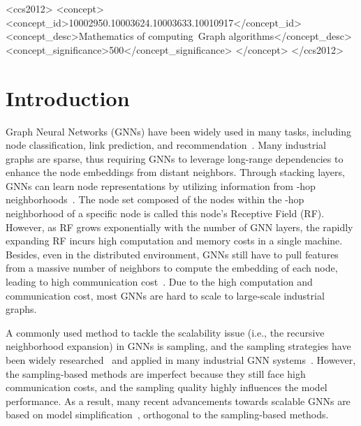 \documentclass[sigconf]{acmart}
\begin{document}
\begin{CCSXML}
<ccs2012>
<concept>
<concept_id>10002950.10003624.10003633.10010917</concept_id>
<concept_desc>Mathematics of computing~Graph algorithms</concept_desc>
<concept_significance>500</concept_significance>
</concept>
</ccs2012>
\end{CCSXML}




\maketitle





\section{Introduction}
Graph Neural Networks (GNNs) have been widely used in many tasks, including node classification, link prediction, and recommendation~\citep{zhang2020reliable, zhang2021rod, cui2020adaptive, miao2021degnn,jiang2022zoomer}.
Many industrial graphs are sparse, thus requiring GNNs to leverage long-range dependencies to enhance the node embeddings from distant neighbors.
Through stacking  layers, GNNs can learn node representations by utilizing information from -hop neighborhoods~\cite{miao2021lasagne}. 
The node set composed of the nodes within the -hop neighborhood of a specific node is called this node's Receptive Field (RF).
However, as RF grows exponentially with the number of GNN layers, the rapidly expanding RF incurs high computation and memory costs in a single machine. 
Besides, even in the distributed environment, GNNs still have to pull features from a massive number of neighbors to compute the embedding of each node, leading to high communication cost~\citep{distdgl_ai3_2020}.
Due to the high computation and communication cost, most GNNs are hard to scale to large-scale industrial graphs.

A commonly used method to tackle the scalability issue (i.e., the recursive neighborhood expansion) in GNNs is sampling, and the sampling strategies have been widely researched~\cite{hamilton2017inductive, DBLP:conf/iclr/ChenMX18} and applied in many industrial GNN systems~\cite{distdgl_ai3_2020, aligraph_vldb_2019}. However, the sampling-based methods are imperfect because they still face high communication costs, and the sampling quality highly influences the model performance. As a result, many recent advancements towards scalable GNNs are based on model simplification~\citep{wu2019simplifying,zhang2021node,zhang2022pasca}, orthogonal to the sampling-based methods.
\end{document}
